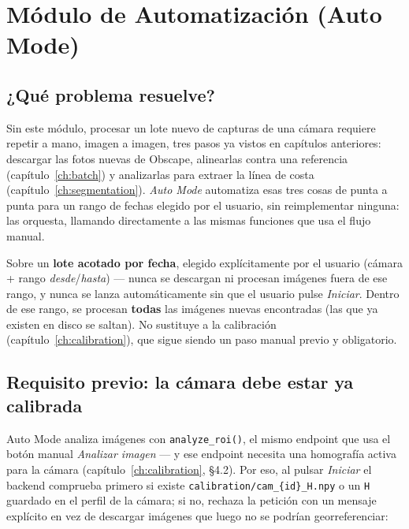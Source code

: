 \chapter{Módulo de Automatización (Auto Mode)}
\label{ch:automode}

\section{¿Qué problema resuelve?}

Sin este módulo, procesar un lote nuevo de capturas de una cámara requiere repetir a mano,
imagen a imagen, tres pasos ya vistos en capítulos anteriores: descargar las fotos nuevas de
Obscape, alinearlas contra una referencia (capítulo~\ref{ch:batch}) y analizarlas para extraer
la línea de costa (capítulo~\ref{ch:segmentation}). \emph{Auto Mode} automatiza esas tres cosas
de punta a punta para un rango de fechas elegido por el usuario, sin reimplementar ninguna: las
orquesta, llamando directamente a las mismas funciones que usa el flujo manual.

\begin{infobox}
Sobre un \textbf{lote acotado por fecha}, elegido explícitamente por el usuario (cámara +
rango \emph{desde}/\emph{hasta}) — nunca se descargan ni procesan imágenes fuera de ese rango,
y nunca se lanza automáticamente sin que el usuario pulse \emph{Iniciar}. Dentro de ese rango,
se procesan \textbf{todas} las imágenes nuevas encontradas (las que ya existen en disco se
saltan). No sustituye a la calibración (capítulo~\ref{ch:calibration}), que sigue siendo un
paso manual previo y obligatorio.
\end{infobox}

\section{Requisito previo: la cámara debe estar ya calibrada}

Auto Mode analiza imágenes con \texttt{analyze\_roi()}, el mismo endpoint que usa el botón
manual \emph{Analizar imagen} — y ese endpoint necesita una homografía activa para la cámara
(capítulo~\ref{ch:calibration}, \S4.2). Por eso, al pulsar \emph{Iniciar} el backend comprueba
primero si existe \texttt{calibration/cam\_\{id\}\_H.npy} o un \texttt{H} guardado en el
perfil de la cámara; si no, rechaza la petición con un mensaje explícito en vez de descargar
imágenes que luego no se podrían georreferenciar:

